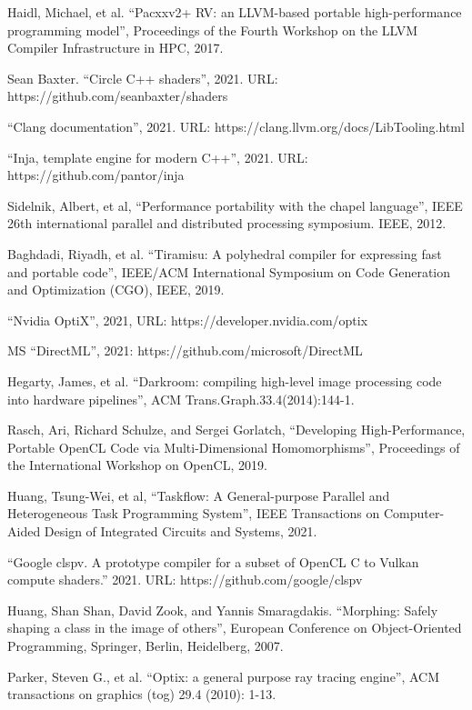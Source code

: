 \documentclass[11pt,fleqn,english,russian]{report} %
\begin{document}
\begin{thebibliography}{10}
	 Haidl, Michael, et al. ``Pacxxv2+ RV: an LLVM-based portable high-performance programming model'', Proceedings of the Fourth Workshop on the LLVM Compiler Infrastructure in HPC, 2017. 
	
	 Sean Baxter. ``Circle C++ shaders'', 2021. URL: https://github.com/seanbaxter/shaders  
	
	 ``Clang documentation'', 2021. URL: https://clang.llvm.org/docs/LibTooling.html
	
	 ``Inja, template engine for modern C++'', 2021. URL: https://github.com/pantor/inja
	
	 Sidelnik, Albert, et al, ``Performance portability with the chapel language'', IEEE 26th international parallel and distributed processing symposium. IEEE, 2012. 
	
	 Baghdadi, Riyadh, et al. ``Tiramisu: A polyhedral compiler for expressing fast and portable code'', IEEE/ACM International Symposium on Code Generation and Optimization (CGO), IEEE, 2019. 
	
	 ``Nvidia OptiX'', 2021, URL: https://developer.nvidia.com/optix 
	
	 MS ``DirectML'', 2021: https://github.com/microsoft/DirectML 
	
	 Hegarty, James, et al. ``Darkroom: compiling high-level image processing code into hardware pipelines'', ACM Trans.Graph.33.4(2014):144-1. 
	
	 Rasch, Ari, Richard Schulze, and Sergei Gorlatch, ``Developing High-Performance, Portable OpenCL Code via Multi-Dimensional Homomorphisms'', Proceedings of the International Workshop on OpenCL, 2019. 
	
	 Huang, Tsung-Wei, et al, ``Taskflow: A General-purpose Parallel and Heterogeneous Task Programming System'', IEEE Transactions on Computer-Aided Design of Integrated Circuits and Systems, 2021. 
	
	 ``Google clspv. A prototype compiler for a subset of OpenCL C to Vulkan compute shaders.'' 2021. URL: https://github.com/google/clspv
	
	 Huang, Shan Shan, David Zook, and Yannis Smaragdakis. ``Morphing: Safely shaping a class in the image of others'', European Conference on Object-Oriented Programming, Springer, Berlin, Heidelberg, 2007. 
	
	 Parker, Steven G., et al. ``Optix: a general purpose ray tracing engine'', ACM transactions on graphics (tog) 29.4 (2010): 1-13.
	

\end{thebibliography}
\end{document}
